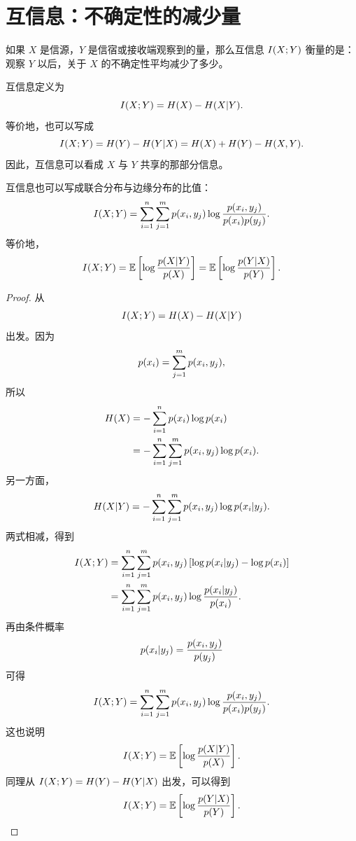\section{互信息：不确定性的减少量}
\quad{}

\begin{strand}
如果 \(X\) 是信源，\(Y\) 是信宿或接收端观察到的量，那么互信息 \(I(X;Y)\)
衡量的是：观察 \(Y\) 以后，关于 \(X\) 的不确定性平均减少了多少。
\end{strand}

\begin{definition}[互信息]
互信息定义为
\[
I(X;Y)=H(X)-H(X|Y).
\]
等价地，也可以写成
\[
I(X;Y)=H(Y)-H(Y|X)
=H(X)+H(Y)-H(X,Y).
\]
因此，互信息可以看成 \(X\) 与 \(Y\) 共享的那部分信息。
\end{definition}

\begin{proposition}[概率形式]
互信息也可以写成联合分布与边缘分布的比值：
\[
I(X;Y)
=\sum_{i=1}^{n}\sum_{j=1}^{m}
p(x_i,y_j)
\log\frac{p(x_i,y_j)}{p(x_i)p(y_j)}.
\]
等价地，
\[
I(X;Y)
=\mathbb{E}\left[\log\frac{p(X|Y)}{p(X)}\right]
=\mathbb{E}\left[\log\frac{p(Y|X)}{p(Y)}\right].
\]
\end{proposition}

\begin{proof}
从
\[
I(X;Y)=H(X)-H(X|Y)
\]
出发。因为
\[
p(x_i)=\sum_{j=1}^{m}p(x_i,y_j),
\]
所以
\[
\begin{aligned}
H(X)
&=-\sum_{i=1}^{n}p(x_i)\log p(x_i)\\
&=-\sum_{i=1}^{n}\sum_{j=1}^{m}
p(x_i,y_j)\log p(x_i).
\end{aligned}
\]
另一方面，
\[
H(X|Y)
=-\sum_{i=1}^{n}\sum_{j=1}^{m}
p(x_i,y_j)\log p(x_i|y_j).
\]
两式相减，得到
\[
\begin{aligned}
I(X;Y)
&=\sum_{i=1}^{n}\sum_{j=1}^{m}
p(x_i,y_j)
\left[\log p(x_i|y_j)-\log p(x_i)\right]\\
&=\sum_{i=1}^{n}\sum_{j=1}^{m}
p(x_i,y_j)
\log\frac{p(x_i|y_j)}{p(x_i)}.
\end{aligned}
\]
再由条件概率
\[
p(x_i|y_j)=\frac{p(x_i,y_j)}{p(y_j)}
\]
可得
\[
I(X;Y)
=\sum_{i=1}^{n}\sum_{j=1}^{m}
p(x_i,y_j)
\log\frac{p(x_i,y_j)}{p(x_i)p(y_j)}.
\]
这也说明
\[
I(X;Y)
=\mathbb{E}\left[\log\frac{p(X|Y)}{p(X)}\right].
\]
同理从 \(I(X;Y)=H(Y)-H(Y|X)\) 出发，可以得到
\[
I(X;Y)
=\mathbb{E}\left[\log\frac{p(Y|X)}{p(Y)}\right].
\]
\end{proof}


